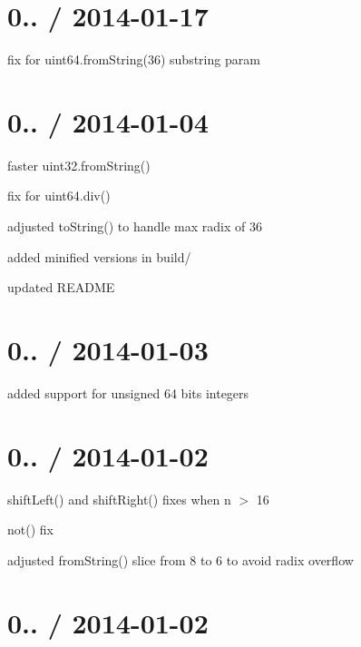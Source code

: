 \section*{0.. / 2014-\/01-\/17 }


\begin{DoxyItemize}
\item fix for uint64.\+from\+String(36) substring param
\end{DoxyItemize}

\section*{0.. / 2014-\/01-\/04 }


\begin{DoxyItemize}
\item faster uint32.\+from\+String()
\item fix for uint64.\+div()
\item adjusted to\+String() to handle max radix of 36
\item added minified versions in build/
\item updated R\+E\+A\+D\+ME
\end{DoxyItemize}

\section*{0.. / 2014-\/01-\/03 }


\begin{DoxyItemize}
\item added support for unsigned 64 bits integers
\end{DoxyItemize}

\section*{0.. / 2014-\/01-\/02 }


\begin{DoxyItemize}
\item shift\+Left() and shift\+Right() fixes when n $>$ 16
\item not() fix
\item adjusted from\+String() slice from 8 to 6 to avoid radix overflow
\end{DoxyItemize}

\section*{0.. / 2014-\/01-\/02 }


